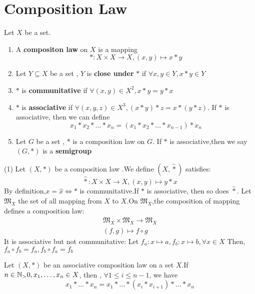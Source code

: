 \documentclass{book}
\numberwithin{equation}{section}
\begin{document}
\section{Composition Law}
\begin{definitionenv}
    Let $X$ be a set.
    \begin{enumerate}[ (i)]
        \item A \textbf{compositon law} on $X$ is a mapping
        $$*:X\times X\rightarrow X,(x,y)\mapsto x * y$$
        \item Let $Y\subseteq X$ be a set , $Y$ is \textbf{close under } $*$ if $\forall x,y \in Y, x*y\in Y$
        \item $*$ is \textbf{communitative} if $\forall (x,y)\in X^2,x*y=y*x$
        \item $*$ is \textbf{associative} if $\forall (x,y,z)\in X^3,(x*y)*z=x*(y*z)$.
        If $*$ is associative, then we can define
    $$x_1*x_2*\dots *x_n=(x_1*x_2*\dots *x_{n-1})*x_n$$
    \item Let $G$ be a set , $*$ is a composition law on $G$. If $*$ is associative,then we say $(G,*)$ is a \textbf{semigroup}
    \end{enumerate}
    
    

\end{definitionenv}
\begin{exampleenv}
    \quad
    \newline
    (1) Let $(X,*)$ be a composition law .We define $(X,\hat{*})$ satisfies:
    $$\hat{*}:X\times X\rightarrow X, (x,y)\mapsto y*x$$
    By definition,$x=\hat{x}\Leftrightarrow *$ is communitative.If $*$ is associative, then so does $\hat{*}$.
    Let $\mathfrak{M} _X$ the set of all mapping from $X$ to $X$.On $\mathfrak{M} _X$,the composition of mapping defines a composition law:
    $$\begin{matrix}
\mathfrak{M} _X\times \mathfrak{M} _X\rightarrow\mathfrak{M} _X \\
(f,g)\mapsto f\circ g

\end{matrix}$$
It is associative but not communitative:
\newline
Let $f_a:x\mapsto a ,f_b:x\mapsto b ,\forall x\in X$ Then,$f_a\circ f_b=f_a,f_b\circ f_a=f_b$
\end{exampleenv}
\begin{propositionenv}
    Let $(X,*)$ be an associative composition law on a set $X$.If $n\in \NN_>0,x_1,\dots,x_n\in X$, then , $\forall 1\le i\le n-1$, we have 
    $$x_1*\dots *x_n=x_1*\dots *(x_i*x_{i+1})*\dots *x_n$$
\end{propositionenv}
\end{document}
